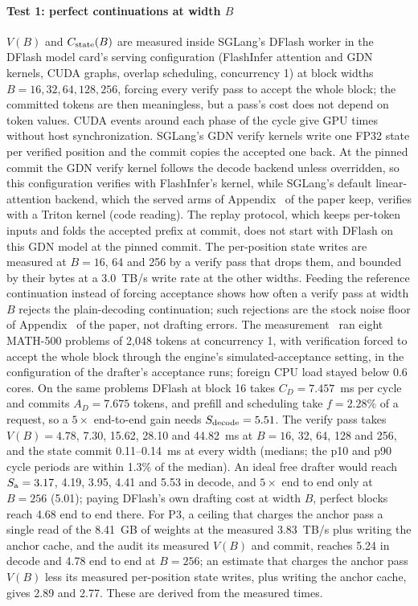 \paragraph{Test 1: perfect continuations at width $B$}\label{sec:repair-stagea} $V(B)$ and $C_{\rm state}(B)$ are measured inside SGLang's DFlash worker in the DFlash model card's serving configuration (FlashInfer attention and GDN kernels, CUDA graphs, overlap scheduling, concurrency 1) at block widths $B=16,32,64,128,256$, forcing every verify pass to accept the whole block; the committed tokens are then meaningless, but a pass's cost does not depend on token values. CUDA events around each phase of the cycle give GPU times without host synchronization. SGLang's GDN verify kernels write one FP32 state per verified position and the commit copies the accepted one back. At the pinned commit the GDN verify kernel follows the decode backend unless overridden, so this configuration verifies with FlashInfer's kernel, while SGLang's default linear-attention backend, which the served arms of Appendix~ of the paper keep, verifies with a Triton kernel (code reading). The replay protocol, which keeps per-token inputs and folds the accepted prefix at commit, does not start with DFlash on this GDN model at the pinned commit. The per-position state writes are measured at $B=16$, 64 and 256 by a verify pass that drops them, and bounded by their bytes at a 3.0~TB/s write rate at the other widths. Feeding the reference continuation instead of forcing acceptance shows how often a verify pass at width $B$ rejects the plain-decoding continuation; such rejections are the stock noise floor of Appendix~ of the paper, not drafting errors. The measurement~ ran eight MATH-500 problems of 2,048 tokens at concurrency 1, with verification forced to accept the whole block through the engine's simulated-acceptance setting, in the configuration of the drafter's acceptance runs; foreign CPU load stayed below 0.6 cores. On the same problems DFlash at block 16 takes $C_D=7.457$~ms per cycle and commits $A_D=7.675$ tokens, and prefill and scheduling take $f=2.28\%$ of a request, so a $5\times$ end-to-end gain needs $S_{\rm decode}=5.51$. The verify pass takes $V(B)=4.78$, 7.30, 15.62, 28.10 and 44.82~ms at $B=16$, 32, 64, 128 and 256, and the state commit 0.11--0.14~ms at every width (medians; the p10 and p90 cycle periods are within 1.3\% of the median). An ideal free drafter would reach $S_{\rm a}=3.17$, 4.19, 3.95, 4.41 and 5.53 in decode, and $5\times$ end to end only at $B=256$ (5.01); paying DFlash's own drafting cost at width $B$, perfect blocks reach 4.68 end to end there. For P3, a ceiling that charges the anchor pass a single read of the 8.41~GB of weights at the measured 3.83~TB/s plus writing the anchor cache, and the audit its measured $V(B)$ and commit, reaches 5.24 in decode and 4.78 end to end at $B=256$; an estimate that charges the anchor pass $V(B)$ less its measured per-position state writes, plus writing the anchor cache, gives 2.89 and 2.77. These are derived from the measured times.

